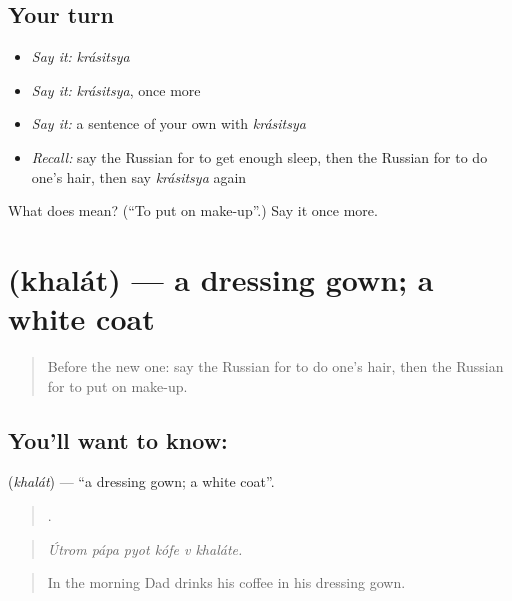 \subsection*{Your turn}
\begin{itemize}
\raggedright
  \item \emph{Say it:} \emph{krásitsya}
  \item \emph{Say it:} \emph{krásitsya}, once more
  \item \emph{Say it:} a sentence of your own with \emph{krásitsya}
  \item \emph{Recall:} say the Russian for to get enough sleep, then the Russian for to do one's hair, then say \emph{krásitsya} again
\end{itemize}

\begin{tcolorbox}[breakable,colback=teal!4,colframe=teal!35!black,title={Before you move on}]
What does  mean? (\textquotedblleft{}To put on make-up\textquotedblright{}.) Say it once more.
\end{tcolorbox}
\section[\texorpdfstring{\ru{халат} (khalát)}{халат (khalát)}]{ (khalát) — a dressing gown; a white coat}

\label{lesson:RU-C534-khalat}



\begin{quote}
Before the new one: say the Russian for to do one's hair, then the Russian for to put on make-up.
\end{quote}

\subsection*{You'll want to know: }
\textbf{} (\emph{khalát}) — \textquotedblleft{}a dressing gown; a white coat\textquotedblright{}.

\begin{quote}
     .
\end{quote}

\begin{quote}
\emph{Útrom pápa pyot kófe v khaláte.}
\end{quote}

\begin{quote}
In the morning Dad drinks his coffee in his dressing gown.
\end{quote}

